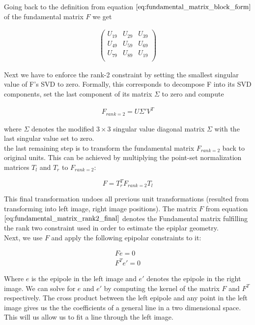 \documentclass{paper}
\begin{document}
Going back to the definition from equation $\ref{eq:fundamental_matrix_block_form}$ of the fundamental matrix $F$ we get

\begin{align}
\left(\begin{array}{ccc}
U_{19} & U_{29} & U_{39} \\
U_{49} & U_{59} & U_{69} \\
U_{79} & U_{89} & U_{19} \\
\end{array} \right)
\end{align}


Next we have to enforce the rank-2 constraint by setting the smallest singular value of F's SVD to zero. Formally, this corresponds to decompose F into its SVD components, set the last component of its matrix $\Sigma$ to zero and compute 

\begin{align}
    F_{rank=2} = U \Sigma' V^{T}
\end{align}

where $\Sigma$ denotes the modified $3 \times 3$ singular value diagonal matrix $\Sigma$ with the last singular value set to zero. \\

the last remaining step is to transform the fundamental matrix $F_{rank=2}$ back to original units. This can be achieved by multiplying the point-set normalization matrices $T_l$ and $T_r$ to $F_{rank=2}$:

\begin{equation}
    F = T_{r}^{T} F_{rank=2} T_{l} 
\label{eq:fundamental_matrix_rank2_final}
\end{equation}

This final transformation undoes all previous unit transformations (resulted from transforming into left image, right image positions). The matrix $F$ from equation $\ref{eq:fundamental_matrix_rank2_final}$ denotes the Fundamental matrix fulfilling the rank two constraint used in order to estimate the epiplar geometry. \\

Next, we use $F$ and apply the following epipolar constraints to it:

\begin{align*}
F e = 0 \\
F^{T} e' = 0 
\end{align*}

Where $e$ is the epipole in the left image and $e'$ denotes the epipole in the right image. We can solve for $e$ and $e'$ by computing the kernel of the matrix $F$ and $F^{T}$ respectively. The cross product between the left epipole and any point in the left image gives us the the coefficients of a general line in a two dimensional space. This will us allow us to fit a line through the left image. \\
\end{document}
